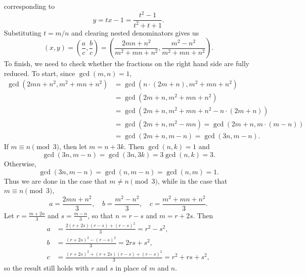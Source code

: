 \begin{enumerate}
corresponding to
\begin{equation*}
y = tx - 1 = \frac{t^2 - 1}{t^2 + t + 1}.
\end{equation*}
Substituting $t = m/n$ and clearing nested denominators gives us
\begin{equation*}
(x,y) = \left(\frac{a}{c},\frac{b}{c}\right) = \left(\frac{2mn + n^2}{m^2 + mn + n^2}, \frac{m^2 - n^2}{m^2 + mn + n^2}\right).
\end{equation*}
To finish, we need to check whether the fractions on the right hand side are fully reduced. To start, since $\gcd(m,n) = 1$,
\begin{align*}
\gcd(2mn + n^2, m^2 + mn + n^2) &= \gcd(n\cdot (2m + n), m^2 + mn + n^2) \\
&= \gcd(2m + n, m^2 + mn + n^2) \\
&= \gcd(2m + n, m^2 + mn + n^2 - n\cdot (2m + n)) \\
&= \gcd(2m + n, m^2 - mn) = \gcd(2m + n, m\cdot (m - n)) \\
&= \gcd(2m + n, m - n) = \gcd(3n, m - n).
\end{align*}
If $m\equiv n\pmod{3}$, then let $m = n + 3k$. Then $\gcd(n,k) = 1$ and
\begin{equation*}
\gcd(3n, m - n) = \gcd(3n,3k) = 3\gcd(n,k) = 3.
\end{equation*}
Otherwise,
\begin{equation*}
\gcd(3n, m - n) = \gcd(n, m - n) = \gcd(n,m) = 1.
\end{equation*}
Thus we are done in the case that $m\neq n\pmod{3}$, while in the case that $m\equiv n\pmod{3}$,
\begin{equation*}
a = \frac{2mn + n^2}{3},\quad b = \frac{m^2 - n^2}{3},\quad c = \frac{m^2 + mn + n^2}{3}.
\end{equation*}
Let $r = \frac{m + 2n}{3}$ and $s = \frac{m - n}{3}$, so that $n = r - s$ and $m = r + 2s$. Then
\begin{align*}
a &= \frac{2(r + 2s)(r - s) + (r - s)^2}{3} = r^2 - s^2, \\
b &= \frac{(r + 2s)^2 - (r - s)^2}{3} = 2rs + s^2, \\
c &= \frac{(r + 2s)^2 + (r + 2s)(r - s) + (r - s)^2}{3} = r^2 + rs + s^2,
\end{align*}
so the result still holds with $r$ and $s$ in place of $m$ and $n$.
\end{enumerate}